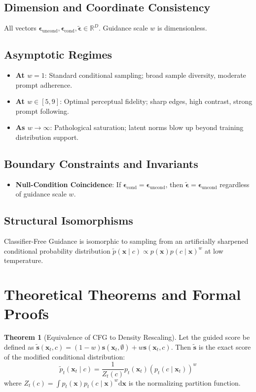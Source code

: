 \documentclass[11pt,a4paper]{article}
\theoremstyle{definition}
\newtheorem{theorem}{\textbf{Theorem}}[section]
\begin{document}
\subsection{Dimension and Coordinate Consistency}
All vectors $\boldsymbol{\epsilon}_{\text{uncond}}, \boldsymbol{\epsilon}_{\text{cond}}, \tilde{\boldsymbol{\epsilon}} \in \mathbb{R}^D$. Guidance scale $w$ is dimensionless.

\subsection{Asymptotic Regimes}
\begin{itemize}
    \item \textbf{At $w = 1$}: Standard conditional sampling; broad sample diversity, moderate prompt adherence.
    \item \textbf{At $w \in [5, 9]$}: Optimal perceptual fidelity; sharp edges, high contrast, strong prompt following.
    \item \textbf{As $w \to \infty$}: Pathological saturation; latent norms blow up beyond training distribution support.
\end{itemize}

\subsection{Boundary Constraints and Invariants}
\begin{itemize}
    \item \textbf{Null-Condition Coincidence}: If $\boldsymbol{\epsilon}_{\text{cond}} = \boldsymbol{\epsilon}_{\text{uncond}}$, then $\tilde{\boldsymbol{\epsilon}} = \boldsymbol{\epsilon}_{\text{uncond}}$ regardless of guidance scale $w$.
\end{itemize}

\subsection{Structural Isomorphisms}
Classifier-Free Guidance is isomorphic to sampling from an artificially sharpened conditional probability distribution $\tilde{p}(\mathbf{x} \mid c) \propto p(\mathbf{x}) p(c \mid \mathbf{x})^w$ at low temperature.

\section{Theoretical Theorems and Formal Proofs}

\begin{theorem}[Equivalence of CFG to Density Rescaling]
Let the guided score be defined as $\tilde{\mathbf{s}}(\mathbf{x}_t, c) = (1 - w)\mathbf{s}(\mathbf{x}_t, \emptyset) + w \mathbf{s}(\mathbf{x}_t, c)$. Then $\tilde{\mathbf{s}}$ is the exact score of the modified conditional distribution:
{\boldmath
\begin{equation}
\tilde{p}_t(\mathbf{x}_t \mid c) = \frac{1}{Z_t(c)} p_t(\mathbf{x}_t) \left( p_t(c \mid \mathbf{x}_t) \right)^w
\end{equation}
}
where $Z_t(c) = \int p_t(\mathbf{x}) p_t(c \mid \mathbf{x})^w \mathrm{d}\mathbf{x}$ is the normalizing partition function.
\end{theorem}
\end{document}
